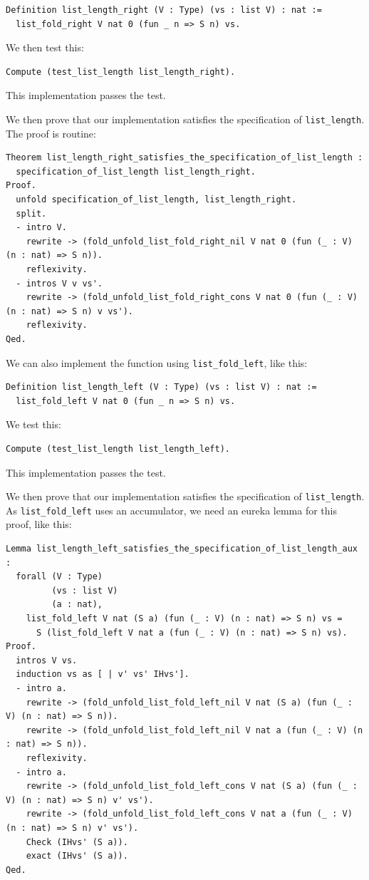 \documentclass{article}
\begin{document}
\begin{lstlisting}
Definition list_length_right (V : Type) (vs : list V) : nat :=
  list_fold_right V nat 0 (fun _ n => S n) vs. 
\end{lstlisting}

We then test this:

\begin{lstlisting}
Compute (test_list_length list_length_right).
\end{lstlisting}

This implementation passes the test.

We then prove that our implementation satisfies the specification of \texttt{list\_length}. The proof is routine:

\begin{lstlisting}
Theorem list_length_right_satisfies_the_specification_of_list_length :
  specification_of_list_length list_length_right.
Proof.
  unfold specification_of_list_length, list_length_right.
  split.
  - intro V.
    rewrite -> (fold_unfold_list_fold_right_nil V nat 0 (fun (_ : V) (n : nat) => S n)).
    reflexivity.
  - intros V v vs'.
    rewrite -> (fold_unfold_list_fold_right_cons V nat 0 (fun (_ : V) (n : nat) => S n) v vs').
    reflexivity.
Qed.
\end{lstlisting}

We can also implement the function using \texttt{list\_fold\_left}, like this:

\begin{lstlisting}            
Definition list_length_left (V : Type) (vs : list V) : nat :=
  list_fold_left V nat 0 (fun _ n => S n) vs.
\end{lstlisting}

We test this:

\begin{lstlisting}
Compute (test_list_length list_length_left).
\end{lstlisting}

This implementation passes the test.

We then prove that our implementation satisfies the specification of \texttt{list\_length}. As \texttt{list\_fold\_left} uses an accumulator, we need an eureka lemma for this proof, like this:

\begin{lstlisting}
Lemma list_length_left_satisfies_the_specification_of_list_length_aux :
  forall (V : Type)
         (vs : list V)
         (a : nat),
    list_fold_left V nat (S a) (fun (_ : V) (n : nat) => S n) vs =
      S (list_fold_left V nat a (fun (_ : V) (n : nat) => S n) vs).
Proof.
  intros V vs.
  induction vs as [ | v' vs' IHvs'].
  - intro a.
    rewrite -> (fold_unfold_list_fold_left_nil V nat (S a) (fun (_ : V) (n : nat) => S n)).
    rewrite -> (fold_unfold_list_fold_left_nil V nat a (fun (_ : V) (n : nat) => S n)).
    reflexivity.
  - intro a.
    rewrite -> (fold_unfold_list_fold_left_cons V nat (S a) (fun (_ : V) (n : nat) => S n) v' vs').
    rewrite -> (fold_unfold_list_fold_left_cons V nat a (fun (_ : V) (n : nat) => S n) v' vs').
    Check (IHvs' (S a)).
    exact (IHvs' (S a)).
Qed.
\end{lstlisting}
\end{document}
